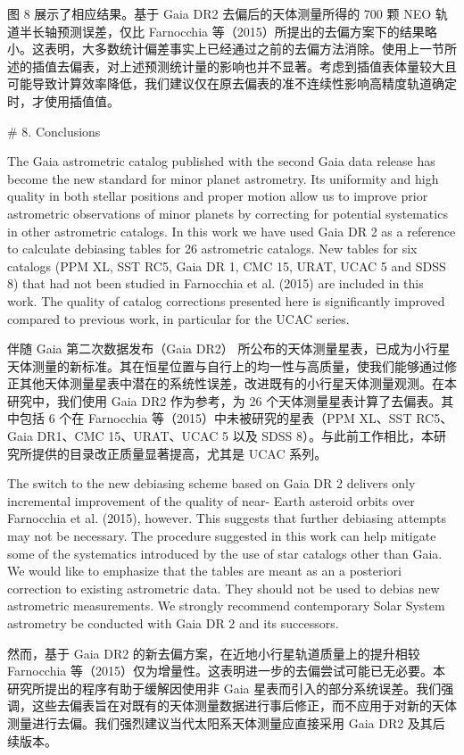 图 8 展示了相应结果。基于 Gaia DR2 去偏后的天体测量所得的 700 颗 NEO 轨道半长轴预测误差，仅比 Farnocchia 等（2015）所提出的去偏方案下的结果略小。这表明，大多数统计偏差事实上已经通过之前的去偏方法消除。使用上一节所述的插值去偏表，对上述预测统计量的影响也并不显著。考虑到插值表体量较大且可能导致计算效率降低，我们建议仅在原去偏表的准不连续性影响高精度轨道确定时，才使用插值值。

# 8. Conclusions

The Gaia astrometric catalog published with the second Gaia data release has become the new standard for minor planet astrometry. Its uniformity and high quality in both stellar positions and proper motion allow us to improve prior astrometric observations of minor planets by correcting for potential systematics in other astrometric catalogs. In this work we have used Gaia DR 2 as a reference to calculate debiasing tables for 26 astrometric catalogs. New tables for six catalogs (PPM XL, SST RC5, Gaia DR 1, CMC 15, URAT, UCAC 5 and SDSS 8) that had not been studied in Farnocchia et al. (2015) are included in this work. The quality of catalog corrections presented here is significantly improved compared to previous work, in particular for the UCAC series. 

伴随 Gaia 第二次数据发布（Gaia DR2） 所公布的天体测量星表，已成为小行星天体测量的新标准。其在恒星位置与自行上的均一性与高质量，使我们能够通过修正其他天体测量星表中潜在的系统性误差，改进既有的小行星天体测量观测。在本研究中，我们使用 Gaia DR2 作为参考，为 26 个天体测量星表计算了去偏表。其中包括 6 个在 Farnocchia 等（2015）中未被研究的星表（PPM XL、SST RC5、Gaia DR1、CMC 15、URAT、UCAC 5 以及 SDSS 8）。与此前工作相比，本研究所提供的目录改正质量显著提高，尤其是 UCAC 系列。

The switch to the new debiasing scheme based on Gaia DR 2 delivers only incremental improvement of the quality of near- Earth asteroid orbits over Farnocchia et al. (2015), however. This suggests that further debiasing attempts may not be necessary. The procedure suggested in this work can help mitigate some of the systematics introduced by the use of star catalogs other than Gaia. We would like to emphasize that the tables are meant as an a posteriori correction to existing astrometric data. They should not be used to debias new astrometric measurements. We strongly recommend contemporary Solar System astrometry be conducted with Gaia DR 2 and its successors.

然而，基于 Gaia DR2 的新去偏方案，在近地小行星轨道质量上的提升相较 Farnocchia 等（2015）仅为增量性。这表明进一步的去偏尝试可能已无必要。本研究所提出的程序有助于缓解因使用非 Gaia 星表而引入的部分系统误差。我们强调，这些去偏表旨在对既有的天体测量数据进行事后修正，而不应用于对新的天体测量进行去偏。我们强烈建议当代太阳系天体测量应直接采用 Gaia DR2 及其后续版本。

